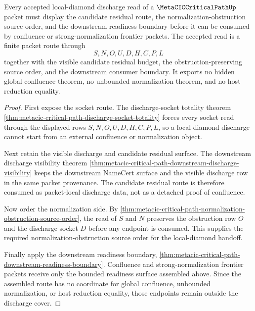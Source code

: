 \begin{theorem}
\label{thm:metacic-critical-path-local-diamond-discharge-cover}
Every accepted local-diamond discharge read of a $\MetaCICCriticalPathUp$ packet must display the candidate residual route, the normalization-obstruction source order, and the downstream readiness boundary before it can be consumed by confluence or strong-normalization frontier packets. The accepted read is a finite packet route through
$$
S,N,O,U,D,H,C,P,L
$$
together with the visible candidate residual budget, the obstruction-preserving source order, and the downstream consumer boundary. It exports no hidden global confluence theorem, no unbounded normalization theorem, and no host reduction equality.
\end{theorem}
\begin{proof}
First expose the socket route. The discharge-socket totality theorem \autoref{thm:metacic-critical-path-discharge-socket-totality} forces every socket read through the displayed rows $S,N,O,U,D,H,C,P,L$, so a local-diamond discharge cannot start from an external confluence or normalization object.

Next retain the visible discharge and candidate residual surface. The downstream discharge visibility theorem \autoref{thm:metacic-critical-path-downstream-discharge-visibility} keeps the downstream NameCert surface and the visible discharge row in the same packet provenance. The candidate residual route is therefore consumed as packet-local discharge data, not as a detached proof of confluence.

Now order the normalization side. By \autoref{thm:metacic-critical-path-normalization-obstruction-source-order}, the read of $S$ and $N$ preserves the obstruction row $O$ and the discharge socket $D$ before any endpoint is consumed. This supplies the required normalization-obstruction source order for the local-diamond handoff.

Finally apply the downstream readiness boundary, \autoref{thm:metacic-critical-path-downstream-readiness-boundary}. Confluence and strong-normalization frontier packets receive only the bounded readiness surface assembled above. Since the assembled route has no coordinate for global confluence, unbounded normalization, or host reduction equality, those endpoints remain outside the discharge cover.
\end{proof}
